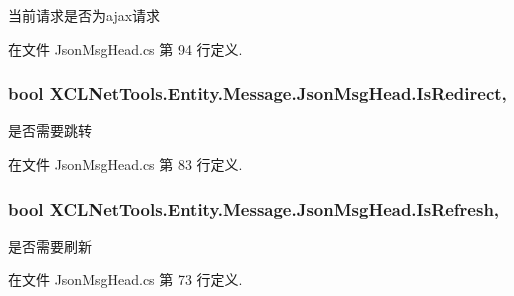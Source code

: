当前请求是否为ajax请求 



在文件 Json\-Msg\-Head.\-cs 第 94 行定义.

\hypertarget{class_x_c_l_net_tools_1_1_entity_1_1_message_1_1_json_msg_head_afc78f2a88e510206f023edef4b774f21}{
\subsubsection[{Is\-Redirect}]{\setlength{\rightskip}{0pt plus 5cm}bool X\-C\-L\-Net\-Tools.\-Entity.\-Message.\-Json\-Msg\-Head.\-Is\-Redirect\hspace{0.3cm}{\ttfamily [get]}, {\ttfamily [set]}}}\label{class_x_c_l_net_tools_1_1_entity_1_1_message_1_1_json_msg_head_afc78f2a88e510206f023edef4b774f21}


是否需要跳转 



在文件 Json\-Msg\-Head.\-cs 第 83 行定义.

\hypertarget{class_x_c_l_net_tools_1_1_entity_1_1_message_1_1_json_msg_head_a85badfa18d73101bd7038ad7a8bc70f0}{
\subsubsection[{Is\-Refresh}]{\setlength{\rightskip}{0pt plus 5cm}bool X\-C\-L\-Net\-Tools.\-Entity.\-Message.\-Json\-Msg\-Head.\-Is\-Refresh\hspace{0.3cm}{\ttfamily [get]}, {\ttfamily [set]}}}\label{class_x_c_l_net_tools_1_1_entity_1_1_message_1_1_json_msg_head_a85badfa18d73101bd7038ad7a8bc70f0}


是否需要刷新 



在文件 Json\-Msg\-Head.\-cs 第 73 行定义.

